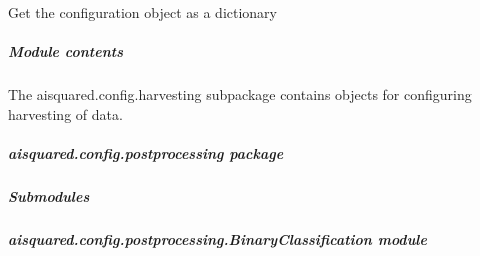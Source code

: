 \documentclass[letterpaper,10pt,english]{sphinxmanual}
\begin{document}
\begin{fulllineitems}
\begin{fulllineitems}
\label{\detokenize{aisquared.config.harvesting:aisquared.config.harvesting.TextHarvester.TextHarvester.regex}}
\pysigstartsignatures
{}
\pysigstopsignatures
\end{fulllineitems}


\begin{fulllineitems}
\label{\detokenize{aisquared.config.harvesting:aisquared.config.harvesting.TextHarvester.TextHarvester.to_dict}}
\pysigstartsignatures
{}
\pysigstopsignatures
\sphinxAtStartPar
Get the configuration object as a dictionary

\end{fulllineitems}


\end{fulllineitems}



\subparagraph{Module contents}
\label{\detokenize{aisquared.config.harvesting:module-aisquared.config.harvesting}}\label{\detokenize{aisquared.config.harvesting:module-contents}}
\sphinxAtStartPar
The aisquared.config.harvesting subpackage contains objects for configuring harvesting of data.

\sphinxstepscope


\subparagraph{aisquared.config.postprocessing package}
\label{\detokenize{aisquared.config.postprocessing:aisquared-config-postprocessing-package}}\label{\detokenize{aisquared.config.postprocessing::doc}}

\subparagraph{Submodules}
\label{\detokenize{aisquared.config.postprocessing:submodules}}

\subparagraph{aisquared.config.postprocessing.BinaryClassification module}
\label{\detokenize{aisquared.config.postprocessing:module-aisquared.config.postprocessing.BinaryClassification}}\label{\detokenize{aisquared.config.postprocessing:aisquared-config-postprocessing-binaryclassification-module}}
\end{document}
